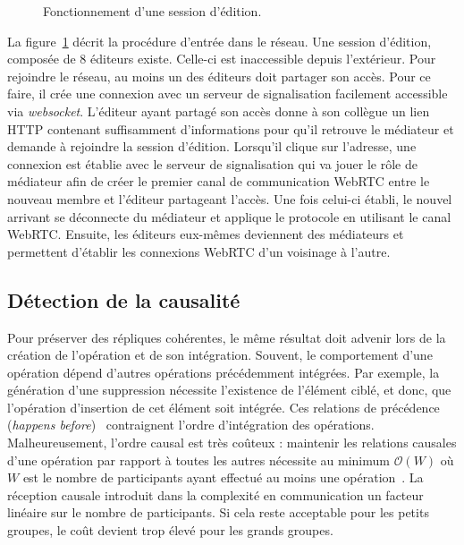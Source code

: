\begin{figure}
  \begin{center}
    
    \caption[Fonctionnement d'une session d'édition]
    {\label{editor:fig:entering}Fonctionnement d'une session d'édition.}
  \end{center}
\end{figure}

La figure~\ref{editor:fig:entering} décrit la procédure d'entrée dans le réseau.
Une session d'édition, composée de 8 éditeurs existe. Celle-ci est inaccessible
depuis l'extérieur. Pour rejoindre le réseau, au moins un des éditeurs doit
partager son accès. Pour ce faire, il crée une connexion avec un serveur de
signalisation facilement accessible via \emph{websocket}. L'éditeur ayant
partagé son accès donne à son collègue un lien HTTP contenant suffisamment
d'informations pour qu'il retrouve le médiateur et demande à rejoindre la
session d'édition. Lorsqu'il clique sur l'adresse, une connexion est établie
avec le serveur de signalisation qui va jouer le rôle de médiateur afin de créer
le premier canal de communication WebRTC entre le nouveau membre et l'éditeur
partageant l'accès. Une fois celui-ci établi, le nouvel arrivant se déconnecte
du médiateur et applique le protocole \SPRAY en utilisant le canal
WebRTC. Ensuite, les éditeurs eux-mêmes deviennent des médiateurs et permettent
d'établir les connexions WebRTC d'un voisinage à l'autre.

\subsection{Détection de la causalité}

Pour préserver des répliques cohérentes, le même résultat doit advenir lors de
la création de l'opération et de son intégration. Souvent, le comportement d'une
opération dépend d'autres opérations précédemment intégrées. Par exemple, la
génération d'une suppression nécessite l'existence de l'élément ciblé, et donc,
que l'opération d'insertion de cet élément soit intégrée. Ces relations de
précédence (\emph{happens before})~\cite{lamport1978time} contraignent l'ordre
d'intégration des opérations.  Malheureusement, l'ordre causal est très coûteux
: maintenir les relations causales d'une opération par rapport à toutes les
autres nécessite au minimum $\mathcal{O}(W)$ où $W$ est le nombre de
participants ayant effectué au moins une
opération~\cite{charronbost1991concerning}. La réception causale introduit dans
la complexité en communication un facteur linéaire sur le nombre de
participants. Si cela reste acceptable pour les petits groupes, le coût devient
trop élevé pour les grands groupes.

